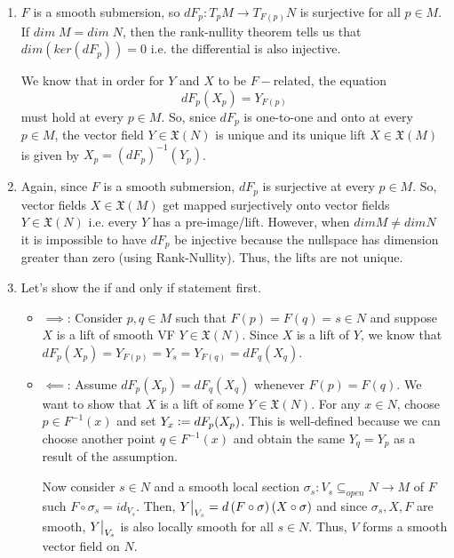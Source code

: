 \documentclass{article}
\newcommand{\defeq}{\vcentcolon=}
\newcommand{\restr}[2]{{%
  \left.\kern-\nulldelimiterspace %
  #1 %
  \vphantom{\big|} %
  \right|_{#2} %
  }}
\begin{document}
\begin{enumerate}[label=(\alph*)]
  \item $F$ is a smooth submersion, so $dF_p : T_p M \rightarrow T_{F(p)} N$ is surjective for all $p \in M$. If $dim \;M = dim \;N$, then the rank-nullity theorem tells us that $dim\left(ker(dF_p)\right) = 0$ i.e. the differential is also injective.
  
  \vskip 0.5cm
  We know that in order for $Y$ and $X$ to be $F-$related, the equation 
  \[ dF_p(X_p) = Y_{F(p)} \] must hold at every $p \in M$. So, snice $dF_p$ is one-to-one and onto at every $p \in M$, the vector field $Y \in \mathfrak{X}(N)$ is unique and its unique lift $X \in \mathfrak{X}(M)$ is given by $X_p = \left(dF_p\right)^{-1}\left(Y_p\right)$.  

  \vskip 1cm
  \item Again, since $F$ is a smooth submersion, $dF_p$ is surjective at every $p \in M$. So, vector fields $X \in \mathfrak{X}(M)$ get mapped surjectively onto vector fields $Y \in \mathfrak{X}(N)$ i.e. every $Y$ has a pre-image/lift. However, when $dim M \neq dim N$ it is impossible to have $dF_p$ be injective because the nullspace has dimension greater than zero (using Rank-Nullity). Thus, the lifts are not unique.
  
  \vskip 1cm
  \item Let's show the if and only if statement first. 
  \begin{itemize}
    \item $\implies$: Consider $p, q \in M$ such that $F(p) = F(q) = s \in N$ and suppose $X$ is a lift of smooth VF $Y \in \mathfrak{X}(N)$. Since $X$ is a lift of $Y$, we know that $dF_p(X_p) = Y_{F(p)} = Y_{s} = Y_{F(q)} = dF_q(X_q)$.
    \item $\impliedby$: Assume $dF_p(X_p) = dF_q(X_q)$ whenever $F(p) = F(q)$. We want to show that $X$ is a lift of some $Y \in \mathfrak{X}(N)$. For any $x \in N$, choose $p \in F^{-1}(x)$ and set $Y_x \defeq dF_{p}(X_p)$. This is well-defined because we can choose another point $q \in F^{-1}(x)$ and obtain the same $Y_q = Y_p$ as a result of the assumption. 
    
    Now consider $s \in N$ and a smooth local section $\sigma_s : V_s \subseteq_{open} N \rightarrow M$ of $F$ such $F \circ \sigma_s = id_{V_s}$. Then, $\restr{Y}{{V_s}} = d\left(F \circ \sigma\right) (X \circ \sigma)$ and since $\sigma_s, X, F$ are smooth, $\restr{Y}{{V_s}}$ is also locally smooth for all $s \in N$. Thus, $V$ forms a smooth vector field on $N$.
    

\end{itemize}
\end{enumerate}
\end{document}
